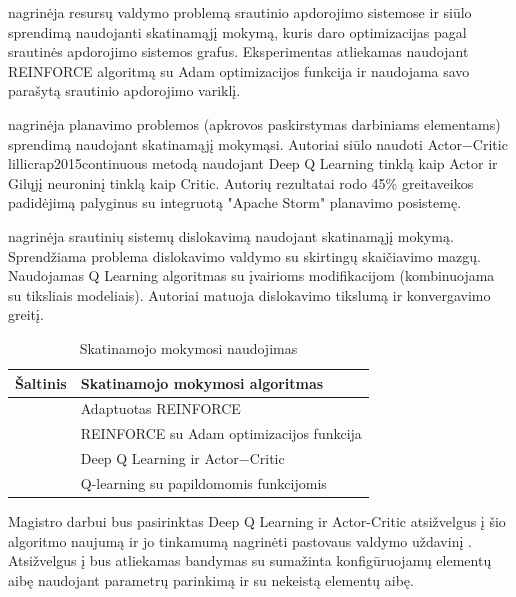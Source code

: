 \documentclass{VUMIFPSbakalaurinis}
\begin{document}
\cite{ni2019generalizable} nagrinėja resursų valdymo problemą srautinio apdorojimo sistemose ir siūlo sprendimą naudojanti skatinamąjį mokymą, kuris daro optimizacijas pagal srautinės apdorojimo sistemos grafus. Eksperimentas atliekamas naudojant REINFORCE \cite{williams1992simple} algoritmą su Adam optimizacijos funkcija \cite{kingma2014adam} ir naudojama savo parašytą srautinio apdorojimo variklį. 

\cite{Li2018Model} nagrinėja planavimo problemos (apkrovos paskirstymas darbiniams elementams) sprendimą naudojant skatinamąjį mokymąsi. Autoriai siūlo naudoti Actor−Critic {lillicrap2015continuous} metodą naudojant Deep Q Learning  \cite{mnih2015human} tinklą kaip Actor ir Gilųjį neuroninį tinklą kaip Critic. Autorių rezultatai rodo 45\% greitaveikos padidėjimą palyginus su integruotą "Apache Storm" planavimo posistemę. 

\cite{Russo2019Reinforcement} nagrinėja srautinių sistemų dislokavimą naudojant skatinamąjį mokymą. Sprendžiama problema dislokavimo valdymo su skirtingų skaičiavimo mazgų. Naudojamas Q Learning algoritmas su įvairioms modifikacijom (kombinuojama su tiksliais modeliais). Autoriai matuoja dislokavimo tikslumą ir konvergavimo greitį. 

\begin{table}[H]
    \begin{tabular}{|l|l|}
    \hline
    Šaltinis                         & Skatinamojo mokymosi algoritmas    \\ \hline
    \cite{vaquero2018autotuning}     & Adaptuotas REINFORCE \cite{williams1992simple}        \\ \hline
    \cite{ni2019generalizable}       & REINFORCE \cite{williams1992simple}  su Adam optimizacijos funkcija \cite{kingma2014adam}     \\ \hline
    \cite{Li2018Model}               & Deep Q Learning \cite{mnih2015human} ir Actor−Critic \cite{lillicrap2015continuous} \\ \hline
    \cite{Russo2019Reinforcement}    & Q-learning \cite{mnih2015human} su papildomomis funkcijomis \\ \hline
    \end{tabular}
    \caption{Skatinamojo mokymosi naudojimas}
    \label{ml-in-stream}
\end{table}

Magistro darbui bus pasirinktas Deep Q Learning ir Actor-Critic atsižvelgus į šio algoritmo naujumą ir jo tinkamumą nagrinėti pastovaus valdymo uždavinį \cite{Silver2014Deterministic}. Atsižvelgus į \cite{vaquero2018autotuning, herodotou2020survey} bus atliekamas bandymas su sumažinta konfigūruojamų elementų aibę naudojant parametrų parinkimą ir su nekeistą elementų aibę.
\end{document}
